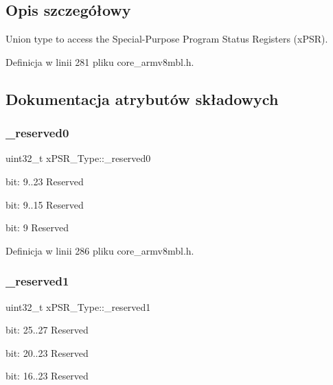 \begin{DoxyCompactItemize}
\begin{tabbing}
\end{tabbing}\end{DoxyCompactItemize}


\subsection{Opis szczegółowy}
Union type to access the Special-\/\+Purpose Program Status Registers (x\+P\+SR). 

Definicja w linii 281 pliku core\+\_\+armv8mbl.\+h.



\subsection{Dokumentacja atrybutów składowych}
\mbox{\label{unionx_p_s_r___type_af438e0f407357e914a70b5bd4d6a97c5}} 
\subsubsection{\texorpdfstring{\+\_\+reserved0}{\_reserved0}}
{\footnotesize\ttfamily uint32\+\_\+t x\+P\+S\+R\+\_\+\+Type\+::\+\_\+reserved0}

bit\+: 9..23 Reserved

bit\+: 9..15 Reserved

bit\+: 9 Reserved 

Definicja w linii 286 pliku core\+\_\+armv8mbl.\+h.

\mbox{\label{unionx_p_s_r___type_a790056bb6f20ea16cecc784b0dd19ad6}} 
\subsubsection{\texorpdfstring{\+\_\+reserved1}{\_reserved1}}
{\footnotesize\ttfamily uint32\+\_\+t x\+P\+S\+R\+\_\+\+Type\+::\+\_\+reserved1}

bit\+: 25..27 Reserved

bit\+: 20..23 Reserved

bit\+: 16..23 Reserved 

